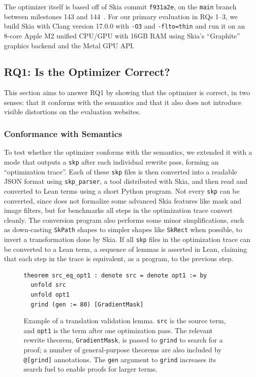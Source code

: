 \documentclass[main.tex]{subfiles}
\begin{document}
The optimizer itself is based off of Skia commit \texttt{f931a2e},
  on the \texttt{main} branch between milestones 143 and 144~\cite{skia-releases}.
For our primary evaluation in RQs 1--3,
  we build Skia with Clang version 17.0.0 with \texttt{-O3} and \texttt{-flto=thin}
  and run it on an 8-core Apple M2 unified CPU/GPU with 16GB RAM
  using Skia's ``Graphite'' graphics backend and the Metal GPU API.

\subsection{RQ1: Is the Optimizer Correct?}
\label{subsec:rq1}

This section aims to answer RQ1 by showing
  that the optimizer is correct,
  in two senses: that it conforms with the \muskia semantics
  and that it also does not introduce visible distortions
  on the evaluation websites.

\subsubsection{Conformance with \muskia Semantics}

To test whether the optimizer conforms with the \muskia semantics,
  we extended it with a mode that outputs a \texttt{skp}
  after each individual rewrite pass,
  forming an ``optimization trace''.
Each of these \texttt{skp} files is then converted
  into a readable JSON format using \texttt{skp\_parser},
  a tool distributed with Skia,
  and then read and converted to \muskia Lean terms
  using a short Python program.
Not every \texttt{skp} can be converted,
  since \muskia does not formalize some advanced Skia features
  like mask and image filters,
  but for \tvCompilePassN benchmarks
  all steps in the optimization trace convert cleanly.
The conversion program also performs some minor simplifications,
  such as down-casting \texttt{SkPath} shapes
  to simpler shapes like \texttt{SkRect} when possible,
  to invert a transformation done by Skia.
If all \texttt{skp} files in the optimization trace
  can be converted to a \muskia Lean term,
  a sequence of lemmas is asserted in Lean,
  claiming that each step in the trace
  is equivalent, as a \muskia program, to the previous step.

\begin{figure}
\small
\begin{BVerbatim}
theorem src_eq_opt1 : denote src = denote opt1 := by
  unfold src
  unfold opt1
  grind (gen := 80) [GradientMask]
\end{BVerbatim}
  \caption{
  Example of a translation validation lemma.
    \texttt{src} is the source \muskia term,
    and \texttt{opt1} is the term after one optimization pass.
  The relevant rewrite theorem, \texttt{GradientMask},
    is passed to \texttt{grind} to search for a proof;
    a number of general-purpose \muskia theorems
    are also included by \texttt{@[grind]} annotations.
  The \texttt{gen} argument to \texttt{grind}
    increases its search fuel
    to enable proofs for larger \muskia terms.}
\label{fig:layerTV}
\end{figure}
\end{document}
